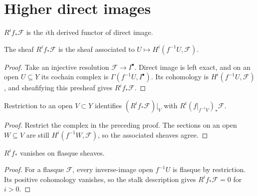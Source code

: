 \section{Higher direct images}
\label{ha-ch3-sec8}
\begin{definition}\label{ha-ch3-def-higher-direct-image}
$R^if_*\mathcal F$ is the $i$th derived functor of direct image.
\end{definition}
\begin{proposition}\label{ha-ch3-prop-direct-image-stalk}
The sheaf $R^if_*\mathcal F$ is the sheaf associated to
$U\mapsto H^i(f^{-1}U,\mathcal F)$.

\end{proposition}
\begin{proof}

Take an injective resolution $\mathcal F\to I^\bullet$.  Direct image is left exact, and on an
open $U\subseteq Y$ its cochain complex is $\Gamma(f^{-1}U,I^\bullet)$.  Its cohomology is
$H^i(f^{-1}U,\mathcal F)$, and sheafifying this presheaf gives $R^if_*\mathcal F$.

\end{proof}
\begin{corollary}\label{ha-ch3-cor-direct-image}
Restriction to an open $V\subset Y$ identifies $(R^if_*\mathcal F)|_V$ with
$R^i(f|_{f^{-1}V})_*\mathcal F$.

\end{corollary}
\begin{proof}

Restrict the complex in the preceding proof.  The sections on an open $W\subseteq V$ are still
$H^i(f^{-1}W,\mathcal F)$, so the associated sheaves agree.

\end{proof}
\begin{corollary}\label{ha-ch3-cor-flasque-vanishing}
$R^if_*$ vanishes on flasque sheaves.

\end{corollary}
\begin{proof}

For a flasque $\mathcal F$, every inverse-image open $f^{-1}U$ is flasque by restriction.  Its
positive cohomology vanishes, so the stalk description gives $R^if_*\mathcal F=0$ for $i>0$.

\end{proof}
